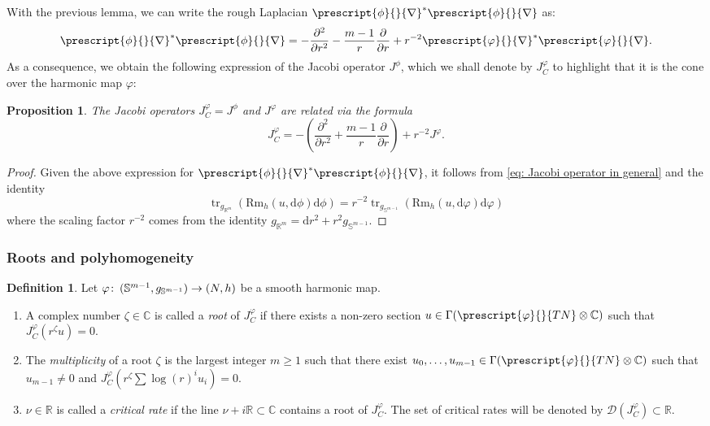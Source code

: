 \documentclass{article}
\numberwithin{equation}{section}        %
\theoremstyle{bfnote}
\newtheorem{prop}[thm]{Proposition}         %
\theoremstyle{definition}
\newtheorem{Def}[thm]{Definition}           %
\theoremstyle{bfremark}
\newcommand{\col}{\colon \thinspace}        %
\newcommand{\R}{\mathbb{R}}                 %
\newcommand{\C}{\mathbb{C}}                 %
\newcommand{\Sp}{\mathbb{S}}                %
\newcommand{\diff}{\mathrm{d}}                      %
\DeclareMathOperator{\tr}{tr}                   %
\begin{document}
With the previous lemma, we can write the rough Laplacian $\prescript{\phi}{}{\nabla}^*\prescript{\phi}{}{\nabla}$ as:
\begin{equation*}
    \prescript{\phi}{}{\nabla}^*\prescript{\phi}{}{\nabla} = -\frac{\partial^2}{\partial r^2} - \frac{m-1}{r} \frac{\partial}{\partial r} + r^{-2} \prescript{\varphi}{}{\nabla}^* \prescript{\varphi}{}{\nabla}  .
\end{equation*}
As a consequence, we obtain the following expression of the Jacobi operator $J^\phi$, which we shall denote by $J^\varphi_C$ to highlight that it is the cone over the harmonic map $\varphi$:

\begin{prop}        \label{prop: Jacobi operator of a cone}
    The Jacobi operators $J^\varphi_C = J^\phi$ and $J^\varphi$ are related via the formula
    \begin{equation*}
        J^\varphi_C = - \left( \frac{\partial^2}{\partial r^2} + \frac{m-1}{r} \frac{\partial}{\partial r} \right) + r^{-2} J^\varphi .
    \end{equation*}
\end{prop}

\begin{proof}
    Given the above expression for $\prescript{\phi}{}{\nabla}^*\prescript{\phi}{}{\nabla}$, it follows from  \eqref{eq: Jacobi operator in general} and the identity
    \begin{equation*}
        \tr_{g_{\R^m}}(\mathrm{Rm}_h(u,\diff\phi)\diff\phi) = r^{-2} \tr_{g_{\Sp^{m-1}}}(\mathrm{Rm}_h(u,\diff\varphi)\diff\varphi)
    \end{equation*}
    where the scaling factor $r^{-2}$ comes from the identity $g_{\R^m} = \diff r^2 + r^2 g_{\Sp^{m-1}}$.
\end{proof}


    \subsubsection{Roots and polyhomogeneity}       \label{subsubsec: roots and polyhomogeneity}

\begin{Def}
    Let $\varphi \col (\Sp^{m-1},g_{\Sp^{m-1}}) \rightarrow (N,h)$ be a smooth harmonic map.
    \begin{enumerate}
        \item A complex number $\zeta \in \C$ is called a \emph{root} of $J^\varphi_C$ if there exists a non-zero section $u \in \Gamma(\prescript{\varphi}{}{TN} \otimes \C)$ such that $J^\varphi_C(r^\zeta u) = 0$. 
        \item The \emph{multiplicity} of a root $\zeta$ is the largest integer $m \geq 1$ such that there exist $u_0,\ldots,u_{m-1} \in \Gamma(\prescript{\varphi}{}{TN} \otimes \C)$ such that $u_{m-1} \neq 0$ and $J^\varphi_C(r^\zeta \sum \log(r)^i u_i) = 0$.
        \item $\nu \in \R$ is called a \emph{critical rate} if the line $\nu + i \R \subset \C$ contains a root of $J^\varphi_C$. The set of critical rates will be denoted by $\mathcal{D}(J^\varphi_C) \subset \R$.
    \end{enumerate}
\end{Def}
\end{document}
